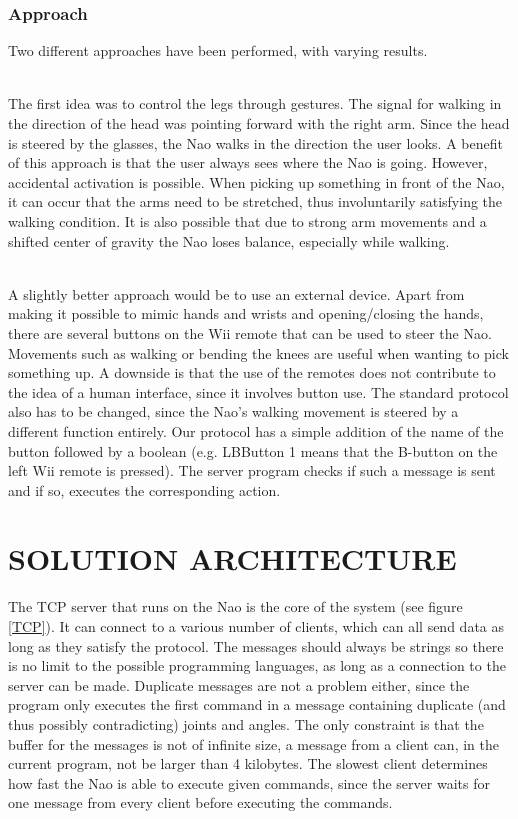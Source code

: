 \documentclass[letterpaper, 10pt, conference]{ieeeconf}
\begin{document}
\subsubsection{Approach}
Two different approaches have been performed, with varying results.

 \\
The first idea was to control the legs through gestures. The signal for walking in the direction of the head was pointing forward with the right arm. Since the head is steered by the glasses, the Nao walks in the direction the user looks. A benefit of this approach is that the user always sees where the Nao is going. However, accidental activation is possible. When picking up something in front of the Nao, it can occur that the arms need to be stretched, thus involuntarily satisfying the walking condition. It is also possible that due to strong arm movements and a shifted center of gravity the Nao loses balance, especially while walking.

 \\
A slightly better approach would be to use an external device. Apart from making it possible to mimic hands and wrists and opening/closing the hands, there are several buttons on the Wii remote that can be used to steer the Nao. Movements such as walking or bending the knees are useful when wanting to pick something up. A downside is that the use of the remotes does not contribute to the idea of a human interface, since it involves button use. The standard protocol also has to be changed, since the Nao’s walking movement is steered by a different function entirely. Our protocol has a simple addition of the name of the button followed by a boolean (e.g. LBButton 1 means that the B-button on the left Wii remote is pressed). The server program checks if such a message is sent and if so, executes the corresponding action.

\section{SOLUTION ARCHITECTURE}
\label{sec:architecture}
The TCP server that runs on the Nao is the core of the system (see figure \ref{TCP}). It can connect to a various number of clients, which can all send data as long as they satisfy the protocol. The messages should always be strings so there is no limit to the possible programming languages, as long as a connection to the server can be made. Duplicate messages are not a problem either, since the program only executes the first command in a message containing duplicate (and thus possibly contradicting) joints and angles. The only constraint is that the buffer for the messages is not of infinite size, a message from a client can, in the current program, not be larger than 4 kilobytes. The slowest client determines how fast the Nao is able to execute given commands, since the server waits for one message from every client before executing the commands.
\end{document}
